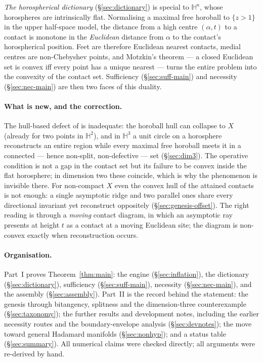 \documentclass[11pt]{article}
\theoremstyle{remark}
\newcommand{\X}{X}
\begin{document}
\emph{The horospherical dictionary} (\S\ref{sec:dictionary}) is special
to $\mathbb{H}^{n}$, whose horospheres are intrinsically flat. Normalising
a maximal free horoball to $\{z>1\}$ in the upper half-space model, the
distance from a high centre $(\alpha,t)$ to a contact is monotone in the
\emph{Euclidean} distance from $\alpha$ to the contact's horospherical
position. Feet are therefore Euclidean nearest contacts, medial centres
are non-Chebyshev points, and Motzkin's theorem --- a closed Euclidean
set is convex iff every point has a unique nearest --- turns the entire
problem into the convexity of the contact set. Sufficiency
(\S\ref{sec:suff-main}) and necessity (\S\ref{sec:nec-main}) are then two
faces of this duality.

\paragraph{What is new, and the correction.} The hull-based defect of
\cite{R1} is inadequate: the horoball hull can collapse to $\X$ (already
for two points in $\mathbb{H}^{2}$), and in $\mathbb{H}^{3}$ a unit
circle on a horosphere reconstructs an entire region while every maximal
free horoball meets it in a connected --- hence non-split, non-defective
--- set (\S\ref{sec:dim3}). The operative condition is not a gap in the
contact set but its failure to be convex inside the flat horosphere; in
dimension two these coincide, which is why the phenomenon is invisible
there. For non-compact $\X$ even the convex hull of the attained contacts
is not enough: a single asymptotic ridge and two parallel ones share
every directional invariant yet reconstruct oppositely
(\S\ref{sec:genesis-offset}). The right reading is through a
\emph{moving} contact diagram, in which an asymptotic ray presents at
height $t$ as a contact at a moving Euclidean site; the diagram is
non-convex exactly when reconstruction occurs.

\paragraph{Organisation.} Part~I proves Theorem~\ref{thm:main}: the
engine (\S\ref{sec:inflation}), the dictionary (\S\ref{sec:dictionary}),
sufficiency (\S\ref{sec:suff-main}), necessity (\S\ref{sec:nec-main}),
and the assembly (\S\ref{sec:assembly}). Part~II is the record behind the
statement: the genesis through bitangency, splitness and the
dimension-three counterexample (\S\ref{sec:taxonomy}); the further results
and development notes, including the earlier necessity routes and the
boundary-envelope analysis (\S\ref{sec:devnotes}); the move toward general
Hadamard manifolds (\S\ref{sec:nonhyp}); and a status table
(\S\ref{sec:summary}). All numerical claims were checked directly; all
arguments were re-derived by hand.
\end{document}
